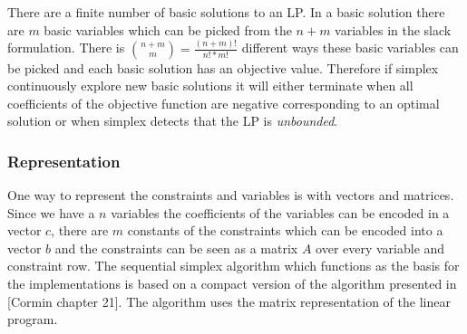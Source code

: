 There are a finite number of basic solutions to an LP. In a basic solution there are $m$ basic variables which can be picked from the $n + m$ variables in the slack formulation. There is ${{n+m}\choose{m}} = \frac{(n+m)!}{n!*m!}$ different ways these basic variables can be picked and each basic solution has an objective value. Therefore if simplex continuously explore new basic solutions it will either terminate when all coefficients of the objective function are negative corresponding to an optimal solution or when simplex detects that the LP is \textit{unbounded}.


\subsubsection{Representation}
One way to represent the constraints and variables is with vectors and matrices. Since we have a $n$ variables the coefficients of the variables can be encoded in a vector $c$, there are $m$ constants of the constraints which can be encoded into a vector $b$ and the constraints can be seen as a matrix $A$ over every variable and constraint row. The sequential simplex algorithm which functions as the basis for the implementations is based on a compact version of the algorithm presented in [Cormin chapter 21]. The algorithm uses the matrix representation of the linear program.
